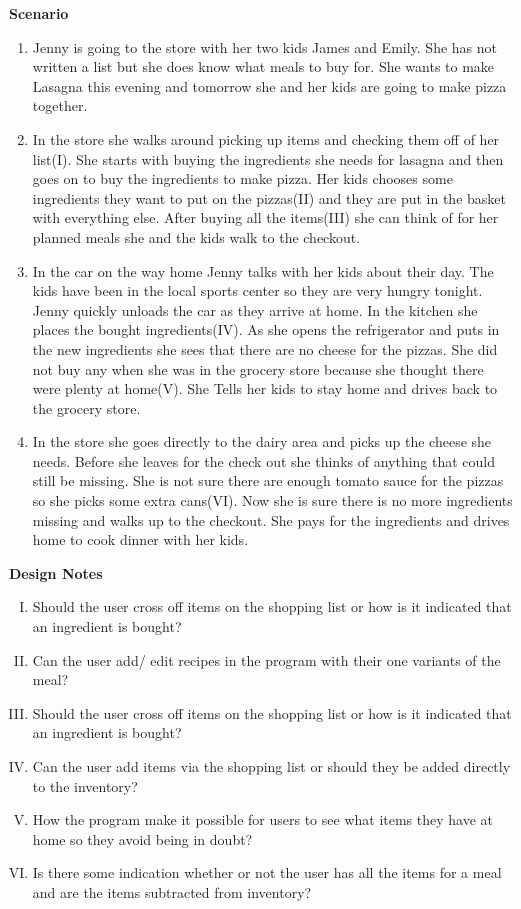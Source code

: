 \textbf{Scenario}
\begin{enumerate}
\item Jenny is going to the store with her two kids James and Emily. She has not written a list but she does know what meals to buy for. She wants to make Lasagna this evening and tomorrow she and her kids are going to make pizza together. 
\item In the store she walks around picking up items and checking them off of her list(I). She starts with buying the ingredients she needs for lasagna and then goes on to buy the ingredients to make pizza. Her kids chooses some ingredients they want to put on the pizzas(II) and they are put in the basket with everything else. After buying all the items(III) she can think of for her planned meals she and the kids walk to the checkout. 
\item In the car on the way home Jenny talks with her kids about their day. The kids have been in the local sports center so they are very hungry tonight. Jenny quickly unloads the car as they arrive at home. In the kitchen she places the bought ingredients(IV). As she opens the refrigerator and puts in the new ingredients she sees that there are no cheese for the pizzas. She did not buy any when she was in the grocery store because she thought there were plenty at home(V). She Tells her kids to stay home and drives back to the grocery store.
\item In the store she goes directly to the dairy area and picks up the cheese she needs. Before she leaves for the check out she thinks of anything that could still be missing. She is not sure there are enough tomato sauce for the pizzas so she picks some extra cans(VI). Now she is sure there is no more ingredients missing and walks up to the checkout. She pays for the ingredients and drives home to cook dinner with her kids.  
\end{enumerate}

\textbf{Design Notes}

\begin{enumerate} [(I)]
\item Should the user cross off items on the shopping list or how is it indicated that an ingredient is bought?  
\item Can the user add/ edit recipes in the program with their one variants of the meal?
\item Should the user cross off items on the shopping list or how is it indicated that an ingredient is bought? 
\item Can the user add items via the shopping list or should they be added directly to the inventory?
\item How the program make it possible for users to see what items they have at home so they avoid being in doubt?
\item Is there some indication whether or not the user has all the items for a meal and are the items subtracted from inventory?
\end{enumerate}

